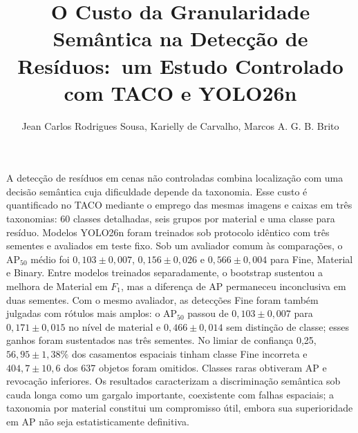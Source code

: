 \documentclass[12pt]{article}
\title{O Custo da Granularidade Semântica na Detecção de Resíduos:\
um Estudo Controlado com TACO e YOLO26n}
\author{Jean Carlos Rodrigues Sousa\inst{1}, Karielly de Carvalho\inst{1},
  Marcos A. G. B. Brito\inst{1}}
\begin{document}
\raggedbottom

\maketitle

\begin{resumo}
A detecção de resíduos em cenas não controladas combina localização com uma decisão semântica cuja dificuldade depende da taxonomia. Esse custo é quantificado no TACO mediante o emprego das mesmas imagens e caixas em três taxonomias: 60 classes detalhadas, seis grupos por material e uma classe para resíduo. Modelos YOLO26n foram treinados sob protocolo idêntico com três sementes e avaliados em teste fixo. Sob um avaliador comum às comparações, o AP$_{50}$ médio foi $0{,}103\pm0{,}007$, $0{,}156\pm0{,}026$ e $0{,}566\pm0{,}004$ para Fine, Material e Binary. Entre modelos treinados separadamente, o bootstrap sustentou a melhora de Material em $F_1$, mas a diferença de AP permaneceu inconclusiva em duas sementes. Com o mesmo avaliador, as detecções Fine foram também julgadas com rótulos mais amplos: o AP$_{50}$ passou de $0{,}103\pm0{,}007$ para $0{,}171\pm0{,}015$ no nível de material e $0{,}466\pm0{,}014$ sem distinção de classe; esses ganhos foram sustentados nas três sementes. No limiar de confiança 0,25, $56{,}95\pm1{,}38\%$ dos casamentos espaciais tinham classe Fine incorreta e $404{,}7\pm10{,}6$ dos 637 objetos foram omitidos. Classes raras obtiveram AP e revocação inferiores. Os resultados caracterizam a discriminação semântica sob cauda longa como um gargalo importante, coexistente com falhas espaciais; a taxonomia por material constitui um compromisso útil, embora sua superioridade em AP não seja estatisticamente definitiva.
\end{resumo}










\end{document}
